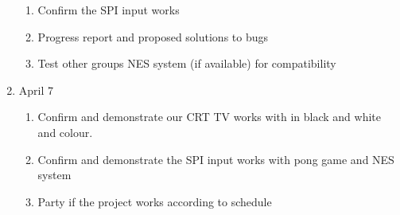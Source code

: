 \begin{enumerate}
\begin{enumerate}
		\item Confirm the SPI input works 
		\item Progress report and proposed solutions to bugs
		\item Test other groups NES system (if available) for compatibility 
	\end{enumerate}
	\item April 7
	\begin{enumerate}
		\item Confirm and demonstrate our CRT TV works with in black and white and colour.
		\item Confirm and demonstrate the SPI input works with pong game and NES system 
		\item Party if the project works according to schedule
	\end{enumerate}
\end{enumerate}
	

